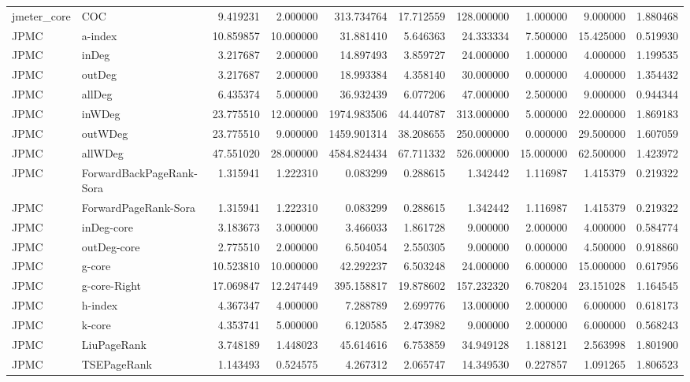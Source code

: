 \begin{tabular}{llrrrrrrrr}
jmeter_core & COC & 9.419231 & 2.000000 & 313.734764 & 17.712559 & 128.000000 & 1.000000 & 9.000000 & 1.880468 \\
JPMC & a-index & 10.859857 & 10.000000 & 31.881410 & 5.646363 & 24.333334 & 7.500000 & 15.425000 & 0.519930 \\
JPMC & inDeg & 3.217687 & 2.000000 & 14.897493 & 3.859727 & 24.000000 & 1.000000 & 4.000000 & 1.199535 \\
JPMC & outDeg & 3.217687 & 2.000000 & 18.993384 & 4.358140 & 30.000000 & 0.000000 & 4.000000 & 1.354432 \\
JPMC & allDeg & 6.435374 & 5.000000 & 36.932439 & 6.077206 & 47.000000 & 2.500000 & 9.000000 & 0.944344 \\
JPMC & inWDeg & 23.775510 & 12.000000 & 1974.983506 & 44.440787 & 313.000000 & 5.000000 & 22.000000 & 1.869183 \\
JPMC & outWDeg & 23.775510 & 9.000000 & 1459.901314 & 38.208655 & 250.000000 & 0.000000 & 29.500000 & 1.607059 \\
JPMC & allWDeg & 47.551020 & 28.000000 & 4584.824434 & 67.711332 & 526.000000 & 15.000000 & 62.500000 & 1.423972 \\
JPMC & ForwardBackPageRank-Sora & 1.315941 & 1.222310 & 0.083299 & 0.288615 & 1.342442 & 1.116987 & 1.415379 & 0.219322 \\
JPMC & ForwardPageRank-Sora & 1.315941 & 1.222310 & 0.083299 & 0.288615 & 1.342442 & 1.116987 & 1.415379 & 0.219322 \\
JPMC & inDeg-core & 3.183673 & 3.000000 & 3.466033 & 1.861728 & 9.000000 & 2.000000 & 4.000000 & 0.584774 \\
JPMC & outDeg-core & 2.775510 & 2.000000 & 6.504054 & 2.550305 & 9.000000 & 0.000000 & 4.500000 & 0.918860 \\
JPMC & g-core & 10.523810 & 10.000000 & 42.292237 & 6.503248 & 24.000000 & 6.000000 & 15.000000 & 0.617956 \\
JPMC & g-core-Right & 17.069847 & 12.247449 & 395.158817 & 19.878602 & 157.232320 & 6.708204 & 23.151028 & 1.164545 \\
JPMC & h-index & 4.367347 & 4.000000 & 7.288789 & 2.699776 & 13.000000 & 2.000000 & 6.000000 & 0.618173 \\
JPMC & k-core & 4.353741 & 5.000000 & 6.120585 & 2.473982 & 9.000000 & 2.000000 & 6.000000 & 0.568243 \\
JPMC & LiuPageRank & 3.748189 & 1.448023 & 45.614616 & 6.753859 & 34.949128 & 1.188121 & 2.563998 & 1.801900 \\
JPMC & TSEPageRank & 1.143493 & 0.524575 & 4.267312 & 2.065747 & 14.349530 & 0.227857 & 1.091265 & 1.806523 \\

\end{tabular}
